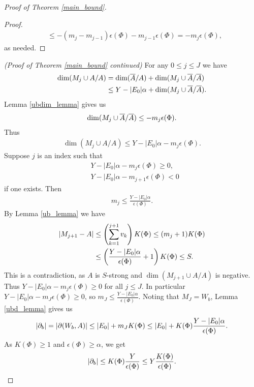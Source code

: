 \begin{proof} [Proof of Theorem \ref{main_bound}]
\begin{proof}
\begin{align*}
      &\leq  -(m_j - m_{j-1})\epsilon(\Phi) - m_{j-1}  \epsilon(\Phi) =  - m_j  \epsilon(\Phi),
    \end{align*}
    as needed.
  \end{proof}
  \textit{(Proof of Theorem \ref{main_bound} continued)}
  For any $0 \leq j \leq J$ we have
  \begin{align*}
    \dim(M_j \cup A / A) &= \dim(\overline{A} / A) + \dim(M_j \cup \overline{A} / \overline{A}) \\
    &\leq Y - |E_0|\alpha + \dim(M_j \cup \overline{A} / \overline{A}).
  \end{align*}
  Lemma \ref{ubdim_lemma} gives us
  \begin{align*}
    \dim(M_j \cup \overline{A} / \overline{A}) \leq -m_j  \epsilon(\Phi).
  \end{align*}
  Thus
  \begin{align*}
    \dim(M_j \cup A / A) \leq Y - |E_0| \alpha - m_j  \epsilon(\Phi).
  \end{align*}
  Suppose $j$ is an index such that
  \begin{align*}
    &Y - |E_0| \alpha - m_j  \epsilon(\Phi) \geq 0, \\
    &Y - |E_0| \alpha - m_{j+1}  \epsilon(\Phi) < 0
  \end{align*}
  if one exists.
  Then 
  \begin{align*}
    m_j \leq \frac{Y - |E_0| \alpha}{\epsilon(\Phi)}.
  \end{align*}
  By Lemma \ref{ub_lemma} we have
  \begin{align*}
    \left|M_{j+1} - A\right| &\leq \left(\sum_{k=1}^{j+1} v_{k}\right) K(\Phi) \leq (m_j + 1) K(\Phi) \\
                     &\leq \left(\frac{Y - |E_0| \alpha}{\epsilon(\Phi)} + 1\right) K(\Phi) \leq S.
  \end{align*}
  This is a contradiction, as $A$ is $S$-strong and $\dim(M_{j+1} \cup A / A)$ is negative.
  Thus $Y - |E_0| \alpha - m_j  \epsilon(\Phi) \geq 0$ for all $j \leq J$.
  In particular $Y - |E_0| \alpha - m_J  \epsilon(\Phi) \geq 0$, so $m_J \leq \frac{Y - |E_0| \alpha}{\epsilon(\Phi)}$.
  Noting that $M_J = W_b$, Lemma \ref{ubd_lemma} gives us 
  \begin{align*}
      |\partial_b| = |\partial(W_b, A)| \leq |E_0| + m_J  K(\Phi) \leq |E_0| + K(\Phi) \frac{Y - |E_0| \alpha}{\epsilon(\Phi)}.
  \end{align*}
  As $K(\Phi) \geq 1$ and $\epsilon(\Phi) \geq \alpha$, we get
  \begin{align*}
      |\ppp_b| \leq K(\Phi) \frac{Y}{\epsilon(\Phi)} \leq Y \frac{K(\Phi)}{\epsilon(\Phi)}.

\end{align*}
\end{proof}
